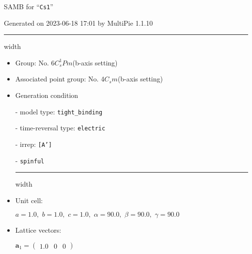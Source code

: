 \documentclass[fleqn,10pt,landscape]{article}
\begin{document}
\setcounter{MaxMatrixCols}{16}

\setlength{\baselineskip}{16pt}
\footnotesize
\begin{center}
\LARGE
SAMB for ``\texttt{Cs1}''
\end{center}
\begin{flushright}
Generated on 2023-06-18 17:01 by MultiPie 1.1.10
\end{flushright}
\vspace{1cm}


 \hfil \hrule height 1mm width \textwidth \hfil

\begin{itemize}
\item Group: No. 6\quad$C_{s}^{1}$\quad$Pm$\quad(b-axis setting)\quad[ monoclinic ]

\item Associated point group: No. 4\quad$C_{s}$\quad$m$\quad(b-axis setting)\quad[ monoclinic ]

\vspace{5mm}

\item Generation condition

\quad - model type: \texttt{tight_binding}

\quad - time-reversal type: \texttt{electric}

\quad - irrep: \texttt{[A']}

\quad - \texttt{spinful}


 \hfil \hrule height 1mm width \textwidth \hfil

\item Unit cell:

\quad $a=1.0,\,\, b=1.0,\,\, c=1.0,\,\, \alpha=90.0,\,\, \beta=90.0,\,\, \gamma=90.0$

\item Lattice vectors:

\quad $\bm{a}_1=\begin{pmatrix} 1.0 & 0 & 0 \end{pmatrix}$


\end{itemize}
\end{document}
